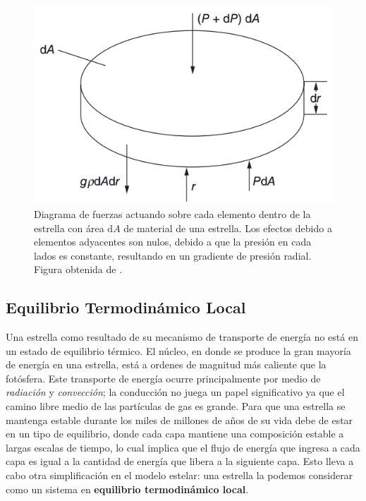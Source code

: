 \begin{figure}[!ht]
	\centering
	\includegraphics[scale=0.5]{Introduccion/Figures/EquilibrioHidrostatico_LeBlanc.png}
	\caption{Diagrama de fuerzas actuando sobre cada elemento dentro de la estrella con 
	área $\mathrm{d}A$ de material de una estrella. Los efectos debido a elementos
	adyacentes son nulos, debido a que la presión en cada lados es constante,
	resultando en un gradiente de presión radial. Figura obtenida de
	.}
	\label{figuraEquilibrioHidrostatico}
\end{figure}

\subsection{Equilibrio Termodinámico Local}

Una estrella como resultado de su mecanismo de transporte de energía no está en
un estado de equilibrio térmico. El núcleo, en donde se produce la gran mayoría
de energía en una estrella, está a ordenes de magnitud más caliente que la
fotósfera. Este transporte de energía ocurre principalmente por medio de
\textit{radiación} y \textit{convección}; la conducción no juega un papel
significativo ya que el camino libre medio de las partículas de gas es grande. 
Para que una estrella se mantenga estable durante los miles de
millones de años de su vida debe de estar en un tipo de equilibrio, donde cada
capa mantiene una composición estable a largas escalas de tiempo,
lo cual implica que el flujo de energía que ingresa a cada capa es igual a la
cantidad de energía que libera a la siguiente capa. Esto lleva a cabo otra
simplificación en el modelo estelar: una estrella la podemos considerar como un
sistema en \textbf{equilibrio termodinámico local}.

